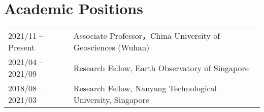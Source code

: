 \section*{Academic Positions}
\begin{tabular}{p{} p{}}
2021/11 -- Present & Associate Professor，China University of Geosciences (Wuhan) \\
2021/04 -- 2021/09 & Research Fellow, Earth Observatory of Singapore \\
2018/08 -- 2021/03 & Research Fellow, Nanyang Technological University, Singapore \\
\end{tabular}
